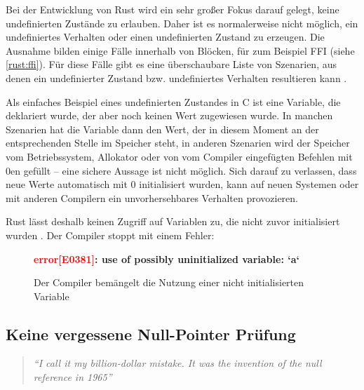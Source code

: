 Bei der Entwicklung von Rust wird ein sehr großer Fokus darauf gelegt, keine undefinierten Zustände zu erlauben.
Daher ist es normalerweise nicht möglich, ein undefiniertes Verhalten oder einen undefinierten Zustand zu erzeugen.
Die Ausnahme bilden einige Fälle innerhalb von  Blöcken, für zum Beispiel FFI (siehe \autoref{rust:ffi}).
Für diese Fälle gibt es eine überschaubare Liste von Szenarien, aus denen ein undefinierter Zustand bzw. undefiniertes Verhalten resultieren kann \cite{rust:book:undefined}.

Als einfaches Beispiel eines undefinierten Zustandes in C ist eine Variable, die deklariert wurde, der aber noch keinen Wert zugewiesen wurde.
In manchen Szenarien hat die Variable dann den Wert, der in diesem Moment an der entsprechenden Stelle im Speicher steht, in anderen Szenarien wird der Speicher vom Betriebssystem, Allokator oder von vom Compiler eingefügten Befehlen mit 0en gefüllt -- eine sichere Aussage ist nicht möglich.
Sich darauf zu verlassen, dass neue Werte automatisch mit 0 initialisiert wurden, kann auf neuen Systemen oder mit anderen Compilern ein unvorhersehbares Verhalten provozieren.

Rust lässt deshalb keinen Zugriff auf Variablen zu, die nicht zuvor initialisiert wurden \cite[126]{rust:orly_programming}.
Der Compiler stoppt mit einem Fehler:

\begin{figure}[H]
	\begin{tcolorbox}[colback=codeBackground,boxrule=0pt,arc=0pt]
		\begin{scriptsize}
			\textbf{\textcolor{red}{error[E0381]}: use of possibly uninitialized variable: `a`}
		\end{scriptsize}
	\end{tcolorbox}
	\caption{Der Compiler bemängelt die Nutzung einer nicht initialisierten Variable}
	\label{rust:rustc:error:no_unitialized_usage}
\end{figure}


\subsection{Keine vergessene Null-Pointer Prüfung}
\label{rust:guarantee:no_null}

\begin{quotation}
	\textit{\enquote{I call it my billion-dollar mistake. It was the invention of the null reference in 1965}}
	\cite[Tony Hoare, QCon Software Konferenz in London, 2009]{rust:infoq:null}
\end{quotation}

